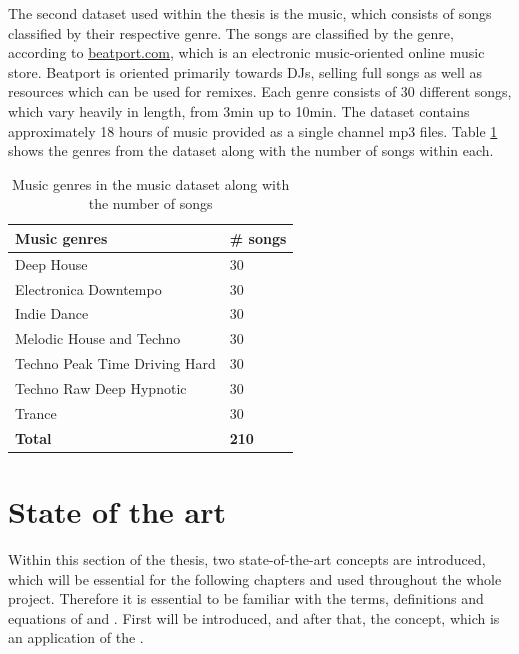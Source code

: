 The second dataset used within the thesis is the music, which consists of songs classified by their respective genre. The songs are classified by the genre, according to \url{beatport.com}, which is an electronic music-oriented online music store. Beatport is oriented primarily towards DJs, selling full songs as well as resources which can be used for remixes. Each genre consists of 30 different songs, which vary heavily in length, from 3min up to 10min. The dataset contains approximately 18 hours of music provided as a single channel mp3 files. Table \ref{tab:Music-Dataset} shows the genres from the dataset along with the number of songs within each.

\begin{table}[htbp]
    \centering
    \caption{Music genres in the music dataset along with the number of songs}
	\label{tab:Music-Dataset}
    \begin{tabular}{p{} | p{}}
        \toprule
        \textbf{Music genres} & \textbf{\# songs} \\ 
        \midrule[1pt]
        Deep House & 30 \\
        \hline
        Electronica Downtempo & 30 \\ 
        \hline
        Indie Dance & 30 \\ 
        \hline
        Melodic House and Techno & 30 \\ 
        \hline
        Techno Peak Time Driving Hard & 30 \\ 
        \hline
        Techno Raw Deep Hypnotic & 30 \\ 
        \hline
        Trance & 30 \\
        \midrule[1pt]
        \textbf{Total} & \textbf{210} \\
        \bottomrule
    \end{tabular}
\end{table}

\section{State of the art}
\label{sec:State-of-art}
Within this section of the thesis, two state-of-the-art concepts are introduced, which will be essential for the following chapters and used throughout the whole project. Therefore it is essential to be familiar with the terms, definitions and equations of  and . First  will be introduced, and after that, the  concept, which is an application of the .

